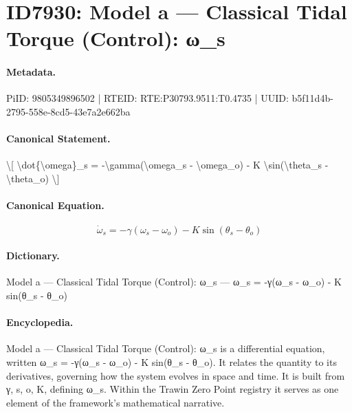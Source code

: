 \section*{ID7930: Model a — Classical Tidal Torque (Control): ω\_s}
\paragraph{Metadata.}
PiID: 9805349896502 | RTEID: RTE:P30793.9511:T0.4735 | UUID: b5f11d4b-2795-558e-8cd5-43e7a2e662ba

\paragraph{Canonical Statement.}
\textbackslash{}[ \textbackslash{}dot\{\textbackslash{}omega\}\_s = -\textbackslash{}gamma(\textbackslash{}omega\_s - \textbackslash{}omega\_o) - K \textbackslash{}sin(\textbackslash{}theta\_s - \textbackslash{}theta\_o) \textbackslash{}]

\paragraph{Canonical Equation.}
\[
\dot{\omega}_s = -\gamma(\omega_s - \omega_o) - K \sin(\theta_s - \theta_o)
\]

\paragraph{Dictionary.}
Model a — Classical Tidal Torque (Control): ω\_s — ω\_s = -γ(ω\_s - ω\_o) - K sin(θ\_s - θ\_o)

\paragraph{Encyclopedia.}
Model a — Classical Tidal Torque (Control): ω\_s is a differential equation, written ω\_s = -γ(ω\_s - ω\_o) - K sin(θ\_s - θ\_o). It relates the quantity to its derivatives, governing how the system evolves in space and time. It is built from γ, s, o, K, defining ω\_s. Within the Trawin Zero Point registry it serves as one element of the framework's mathematical narrative.
